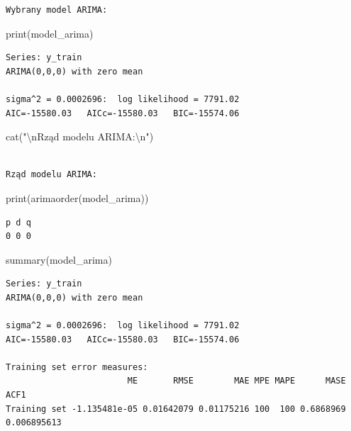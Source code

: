 \documentclass[
  polish,
  letterpaper,
  DIV=11,
  numbers=noendperiod]{scrartcl}
\newenvironment{Shaded}{\begin{snugshade}}{\end{snugshade}}
\newcommand{\FunctionTok}[1]{\textcolor[rgb]{0.28,0.35,0.67}{#1}}
\newcommand{\NormalTok}[1]{\textcolor[rgb]{0.00,0.23,0.31}{#1}}
\newcommand{\SpecialCharTok}[1]{\textcolor[rgb]{0.37,0.37,0.37}{#1}}
\newcommand{\StringTok}[1]{\textcolor[rgb]{0.13,0.47,0.30}{#1}}
\begin{document}
\begin{verbatim}
Wybrany model ARIMA:
\end{verbatim}

\begin{Shaded}
\begin{Highlighting}[]
\FunctionTok{print}\NormalTok{(model\_arima)}
\end{Highlighting}
\end{Shaded}

\begin{verbatim}
Series: y_train 
ARIMA(0,0,0) with zero mean 

sigma^2 = 0.0002696:  log likelihood = 7791.02
AIC=-15580.03   AICc=-15580.03   BIC=-15574.06
\end{verbatim}

\begin{Shaded}
\begin{Highlighting}[]
\FunctionTok{cat}\NormalTok{(}\StringTok{"}\SpecialCharTok{\textbackslash{}n}\StringTok{Rząd modelu ARIMA:}\SpecialCharTok{\textbackslash{}n}\StringTok{"}\NormalTok{)}
\end{Highlighting}
\end{Shaded}

\begin{verbatim}

Rząd modelu ARIMA:
\end{verbatim}

\begin{Shaded}
\begin{Highlighting}[]
\FunctionTok{print}\NormalTok{(}\FunctionTok{arimaorder}\NormalTok{(model\_arima))}
\end{Highlighting}
\end{Shaded}

\begin{verbatim}
p d q 
0 0 0 
\end{verbatim}

\begin{Shaded}
\begin{Highlighting}[]
\FunctionTok{summary}\NormalTok{(model\_arima)}
\end{Highlighting}
\end{Shaded}

\begin{verbatim}
Series: y_train 
ARIMA(0,0,0) with zero mean 

sigma^2 = 0.0002696:  log likelihood = 7791.02
AIC=-15580.03   AICc=-15580.03   BIC=-15574.06

Training set error measures:
                        ME       RMSE        MAE MPE MAPE      MASE        ACF1
Training set -1.135481e-05 0.01642079 0.01175216 100  100 0.6868969 0.006895613
\end{verbatim}
\end{document}
